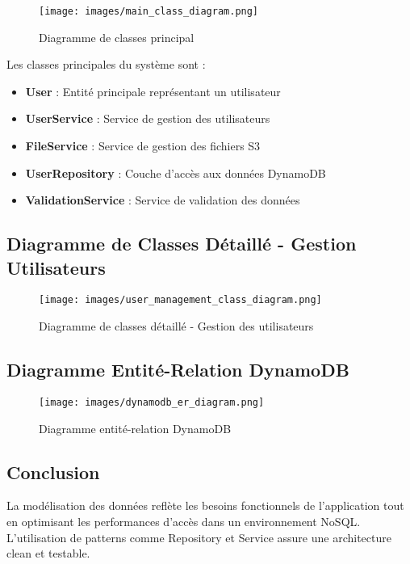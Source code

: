 \begin{figure}[H]
    \centering
    \texttt{[image: images/main\_class\_diagram.png]}
    \caption{Diagramme de classes principal}
    \label{fig:main_class_diagram}
\end{figure}

Les classes principales du système sont :

\begin{itemize}
    \item \textbf{User} : Entité principale représentant un utilisateur
    \item \textbf{UserService} : Service de gestion des utilisateurs
    \item \textbf{FileService} : Service de gestion des fichiers S3
    \item \textbf{UserRepository} : Couche d'accès aux données DynamoDB
    \item \textbf{ValidationService} : Service de validation des données
\end{itemize}

\subsection{Diagramme de Classes Détaillé - Gestion Utilisateurs}

\begin{figure}[H]
    \centering
    \texttt{[image: images/user\_management\_class\_diagram.png]}
    \caption{Diagramme de classes détaillé - Gestion des utilisateurs}
    \label{fig:user_class_diagram}
\end{figure}

\subsection{Diagramme Entité-Relation DynamoDB}

\begin{figure}[H]
    \centering
    \texttt{[image: images/dynamodb\_er\_diagram.png]}
    \caption{Diagramme entité-relation DynamoDB}
    \label{fig:dynamodb_er}
\end{figure}

\subsection{Conclusion}

La modélisation des données reflète les besoins fonctionnels de l'application tout en optimisant les performances d'accès dans un environnement NoSQL. L'utilisation de patterns comme Repository et Service assure une architecture clean et testable.

